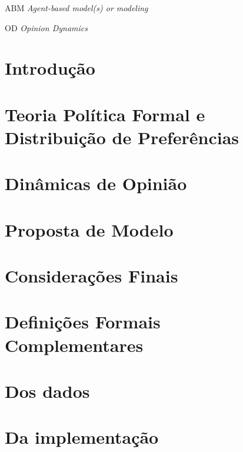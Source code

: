 \documentclass[
12pt,				%
openright,			%
oneside,			%
a4paper,			%
english, %
french, %
spanish, %
brazil %
]{abntex2}
\begin{document}
\begin{siglas}
\item[ABM] \textit{Agent-based model(s) or modeling}
  \item[OD] \textit{ Opinion Dynamics}
 
\end{siglas}
	\tableofcontents*
	\cleardoublepage
	\textual
	
	
	
\chapter*[Introdução]{Introdução}
      
\chapter{Teoria Política Formal e Distribuição de Preferências}


\chapter{Dinâmicas de Opinião}


 


 \chapter{Proposta de Modelo}

 



\chapter*[Considerações Finais]{Considerações Finais}


  
    
\begin{apendicesenv}
  \partapendices

  \chapter{Definições Formais Complementares}
  
\chapter{Dos dados}



\chapter{Da implementação}



\end{apendicesenv}
\end{document}
